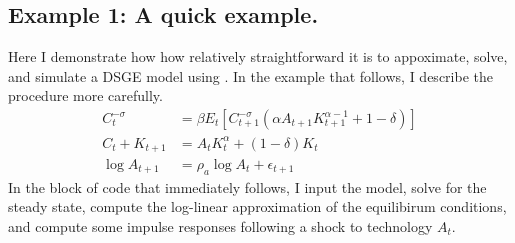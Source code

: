 \documentclass[letterpaper,10pt,openany,oneside,english]{sphinxmanual}
\begin{document}
\subsection{Example 1: A quick example.}
\label{\detokenize{examples:Example-1:-A-quick-example.}}
Here I demonstrate how how relatively straightforward it is to
appoximate, solve, and simulate a DSGE model using . In
the example that follows, I describe the procedure more carefully.
\label{\detokenize{examples:equation-examples:3}}\label{equation:examples:examples:3}\begin{align}
C_t^{-\sigma} & = \beta E_t \left[C_{t+1}^{-\sigma}(\alpha A_{t+1} K_{t+1}^{\alpha-1} + 1 - \delta)\right]\\
C_t + K_{t+1} & = A_t K_t^{\alpha} + (1-\delta)K_t\\
\log A_{t+1} & = \rho_a \log A_{t} + \epsilon_{t+1}
\end{align}
In the block of code that immediately follows, I input the model, solve
for the steady state, compute the log-linear approximation of the
equilibirum conditions, and compute some impulse responses following a
shock to technology \(A_t\).
\end{document}
